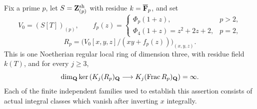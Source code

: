 \begin{theorem}\label{d3:thm:singlefixedalldegree}
Fix a prime $p$, let $S=\mathbf Z_{(p)}^{\mathrm{sh}}$ with residue
$k=\overline{\mathbf F}_p$, and set
\[
 V_0=(S[T])_{(p)},\qquad
 f_p(z)=
 \begin{cases}
  \Phi_p(1+z),&p>2,\\
  \Phi_4(1+z)=z^2+2z+2,&p=2,
 \end{cases}
\]
\[
 R_p=\bigl(V_0[x,y,z]/(xy+f_p(z))\bigr)_{(x,y,z)}.
\]
This is one Noetherian regular local ring of dimension three,
with residue field $k(T)$, and for every $j\geq3$,
\[
 \dim_{\mathbf Q}\ker\left(K_j(R_p)_{\mathbf Q}
            \longrightarrow K_j(\operatorname{Frac} R_p)_{\mathbf Q}\right)=\infty.
\]
Each of the finite independent families used to establish this
assertion consists of actual integral classes which vanish after
inverting $x$ integrally.
\end{theorem}

